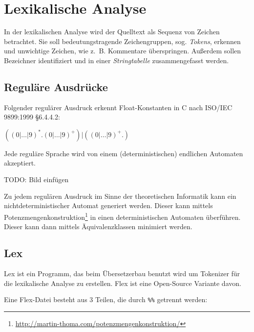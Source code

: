 \section{Lexikalische Analyse}%
In der lexikalischen Analyse wird der Quelltext als Sequenz von Zeichen betrachtet.
Sie soll bedeutungstragende Zeichengruppen, sog. \textit{Tokens},
erkennen und unwichtige Zeichen, wie z.~B. Kommentare überspringen. Außerdem
sollen Bezeichner identifiziert und in einer \textit{Stringtabelle}
zusammengefasst werden.

\begin{beispiel}
\end{beispiel}

\subsection{Reguläre Ausdrücke}
\begin{beispiel}
	Folgender regulärer Ausdruck erkennt Float-Konstanten in C nach
	ISO/IEC 9899:1999 §6.4.4.2:

	$((0|\dots|9)^*.(0|\dots|9)^+)|((0|\dots|9)^+.)$
\end{beispiel}

\begin{satz}
	Jede reguläre Sprache wird von einem (deterministischen) endlichen
	Automaten akzeptiert.
\end{satz}

TODO: Bild einfügen

Zu jedem regulären Ausdruck im Sinne der theoretischen Informatik kann ein
nichtdeterministischer Automat generiert werden. Dieser kann mittels
Potenzmengenkonstruktion\footnote{\url{http://martin-thoma.com/potenzmengenkonstruktion/}}
in einen deterministischen Automaten überführen. Dieser kann dann mittels
Äquivalenzklassen minimiert werden.


\subsection{Lex}
Lex ist ein Programm, das beim Übersetzerbau benutzt wird um Tokenizer für die
lexikalische Analyse zu erstellen. Flex ist eine Open-Source Variante davon.

Eine Flex-Datei besteht aus 3 Teilen, die durch \texttt{\%\%} getrennt werden:

